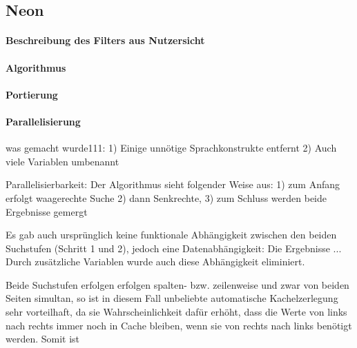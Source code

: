 
\subsection{Neon}
\paragraph{Beschreibung des Filters aus Nutzersicht}
\paragraph{Algorithmus} 
\paragraph{Portierung}
\paragraph{Parallelisierung}

was gemacht wurde111:
1) Einige unnötige Sprachkonstrukte entfernt
2) Auch viele Variablen umbenannt

Parallelisierbarkeit:
Der Algorithmus sieht folgender Weise aus:
	1) zum Anfang erfolgt waagerechte Suche 
	2) dann Senkrechte,
	3) zum Schluss werden beide Ergebnisse gemergt
	
Es gab auch ursprünglich keine funktionale Abhängigkeit zwischen den beiden Suchstufen (Schritt 1 und 2), 
jedoch eine Datenabhängigkeit: Die Ergebnisse ...
Durch zusätzliche Variablen wurde auch diese Abhängigkeit eliminiert.

Beide Suchstufen erfolgen erfolgen spalten- bzw. zeilenweise und zwar von beiden Seiten simultan,
so ist in diesem Fall unbeliebte automatische Kachelzerlegung sehr vorteilhaft, da sie Wahrscheinlichkeit dafür erhöht, 
dass die Werte von links nach rechts immer noch in Cache bleiben, wenn sie von rechts nach links benötigt werden.
Somit ist 
